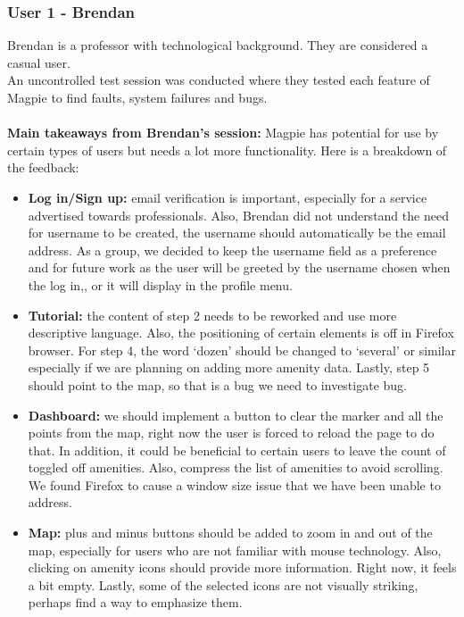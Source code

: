 \subsubsection{User 1 - Brendan}
Brendan is a professor with technological background. They are considered a casual user.\\
An uncontrolled test session was conducted where they tested each feature of Magpie to find faults, system failures and bugs.\\ \\
\textbf{Main takeaways from Brendan's session: }Magpie has potential for use by certain types of users but needs a lot more functionality. Here is a breakdown of the feedback:
\begin{itemize}
    \item \textbf{Log in/Sign up: } email verification is important, especially for a service advertised towards professionals. Also, Brendan did not understand the need for username to be created, the username should automatically be the email address. As a group, we decided to keep the username field as a preference and for future work as the user will be greeted by the username chosen when the log in,, or it will display in the profile menu.\\
    \item \textbf{Tutorial: }the content of step 2 needs to be reworked and use more descriptive language. Also, the positioning of certain elements is off in Firefox browser. For step 4, the word `dozen' should be changed to `several' or similar especially if we are planning on adding more amenity data. Lastly, step 5 should point to the map, so that is a bug we need to investigate bug.\\
    \item \textbf{Dashboard: }we should implement a button to clear the marker and all the points from the map, right now the user is forced to reload the page to do that. In addition, it could be beneficial to certain users to leave the count of toggled off amenities. Also, compress the list of amenities to avoid scrolling.\\ We found Firefox to cause a window size issue that we have been unable to address.\\
    \item \textbf{Map: } plus and minus buttons should be added to zoom in and out of the map, especially for users who are not familiar with mouse technology. Also, clicking on amenity icons should provide more information. Right now, it feels a bit empty. Lastly, some of the selected icons are not visually striking, perhaps find a way to emphasize them.\\

\end{itemize}
